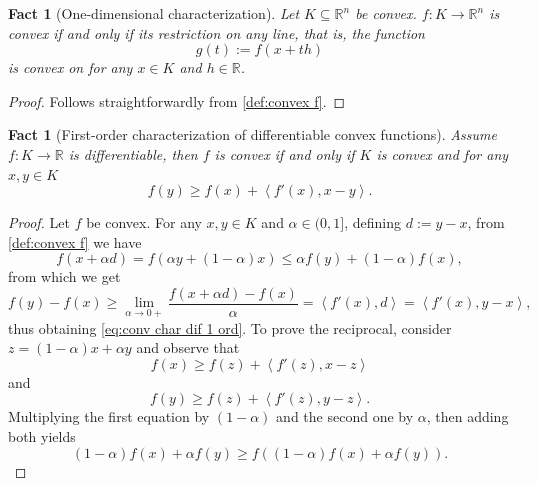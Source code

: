 \documentclass[smallextended,numbook,nospthms]{svjour3}
\theoremstyle{plain}
\newtheorem{fact}[theorem]{Fact}
\theoremstyle{definition}
\def\RR{\mathds R}
\newcommand{\scal}[2]{\left\langle{#1},{#2}  \right\rangle}
\begin{document}
\begin{fact}[One-dimensional characterization]\label{fact:conv 1 dim char}
	Let $K \subseteq \RR^n$ be convex. $f:K \rightarrow \RR^n$ is convex if and only if its restriction on any line, that is, the function
	$$
	g(t):=f(x+th)
	$$
	is convex on for any $x \in K$ and $h \in \RR$.
\end{fact} 
\begin{proof}
	Follows straightforwardly from \cref{def:convex f}.
\end{proof}

\begin{fact}[First-order characterization of differentiable convex functions]\label{fact:conv char dif 1 ord}
	Assume $f:K\rightarrow \RR$ is differentiable, then $f$ is convex if and only if $K$ is convex and for any $x, y \in K$
	$$
	f(y) \geq f(x)+\scal{f'(x)}{x-y}. \label{eq:conv char dif 1 ord}
	$$
\end{fact}
\begin{proof}
Let $f$ be convex. For any $x, y \in K$ and $\alpha \in (0,1]$, defining $d:=y-x$, from \cref{def:convex f} we have
\[
f(x + \alpha d)=f(\alpha y + (1-\alpha)x) \leq \alpha f(y) + (1-\alpha)f(x),
\]
from which we get
\[
f(y)-f(x) \geq \lim_{\alpha \rightarrow 0+} \frac{f(x+\alpha d)-f(x)}{\alpha}=\scal{f'(x)}{d}=\scal{f'(x)}{y-x},
\]
thus obtaining \cref{eq:conv char dif 1 ord}.
To prove the reciprocal, consider $z=(1-\alpha)x+\alpha y$ and observe that
\[
f(x) \geq f(z) + \scal{f'(z)}{x-z}
\]
and
\[
f(y) \geq f(z) + \scal{f'(z)}{y-z}.
\]
Multiplying the first equation by $(1-\alpha)$ and the second one by $\alpha$, then adding both yields
\[
(1-\alpha)f(x)+\alpha f(y) \geq f\left((1-\alpha)f(x) + \alpha f(y)\right).
\]
\end{proof}
\end{document}

